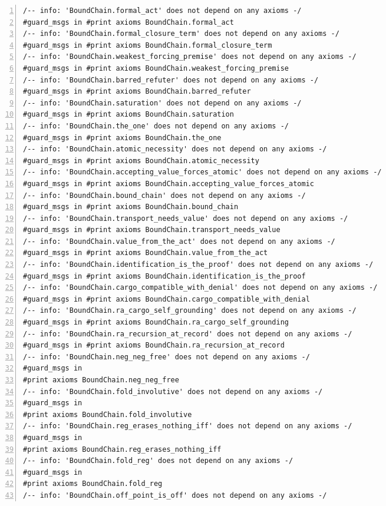 \documentclass[10pt]{article}
\newcommand{\leansize}{\fontsize{5.5pt}{6.75pt}\selectfont}
\begin{document}
\begin{multicols}{2}
\begin{Verbatim}[numbers=left,firstnumber=1,numbersep=3pt,xleftmargin=2.6em,breaklines=true,breakanywhere=true,breakautoindent=false,breakindent=1.4em,breaksymbolleft={},breakanywheresymbolpre={},fontsize=\leansize]
/-- info: 'BoundChain.formal_act' does not depend on any axioms -/
#guard_msgs in #print axioms BoundChain.formal_act
/-- info: 'BoundChain.formal_closure_term' does not depend on any axioms -/
#guard_msgs in #print axioms BoundChain.formal_closure_term
/-- info: 'BoundChain.weakest_forcing_premise' does not depend on any axioms -/
#guard_msgs in #print axioms BoundChain.weakest_forcing_premise
/-- info: 'BoundChain.barred_refuter' does not depend on any axioms -/
#guard_msgs in #print axioms BoundChain.barred_refuter
/-- info: 'BoundChain.saturation' does not depend on any axioms -/
#guard_msgs in #print axioms BoundChain.saturation
/-- info: 'BoundChain.the_one' does not depend on any axioms -/
#guard_msgs in #print axioms BoundChain.the_one
/-- info: 'BoundChain.atomic_necessity' does not depend on any axioms -/
#guard_msgs in #print axioms BoundChain.atomic_necessity
/-- info: 'BoundChain.accepting_value_forces_atomic' does not depend on any axioms -/
#guard_msgs in #print axioms BoundChain.accepting_value_forces_atomic
/-- info: 'BoundChain.bound_chain' does not depend on any axioms -/
#guard_msgs in #print axioms BoundChain.bound_chain
/-- info: 'BoundChain.transport_needs_value' does not depend on any axioms -/
#guard_msgs in #print axioms BoundChain.transport_needs_value
/-- info: 'BoundChain.value_from_the_act' does not depend on any axioms -/
#guard_msgs in #print axioms BoundChain.value_from_the_act
/-- info: 'BoundChain.identification_is_the_proof' does not depend on any axioms -/
#guard_msgs in #print axioms BoundChain.identification_is_the_proof
/-- info: 'BoundChain.cargo_compatible_with_denial' does not depend on any axioms -/
#guard_msgs in #print axioms BoundChain.cargo_compatible_with_denial
/-- info: 'BoundChain.ra_cargo_self_grounding' does not depend on any axioms -/
#guard_msgs in #print axioms BoundChain.ra_cargo_self_grounding
/-- info: 'BoundChain.ra_recursion_at_record' does not depend on any axioms -/
#guard_msgs in #print axioms BoundChain.ra_recursion_at_record
/-- info: 'BoundChain.neg_neg_free' does not depend on any axioms -/
#guard_msgs in
#print axioms BoundChain.neg_neg_free
/-- info: 'BoundChain.fold_involutive' does not depend on any axioms -/
#guard_msgs in
#print axioms BoundChain.fold_involutive
/-- info: 'BoundChain.reg_erases_nothing_iff' does not depend on any axioms -/
#guard_msgs in
#print axioms BoundChain.reg_erases_nothing_iff
/-- info: 'BoundChain.fold_reg' does not depend on any axioms -/
#guard_msgs in
#print axioms BoundChain.fold_reg
/-- info: 'BoundChain.off_point_is_off' does not depend on any axioms -/

\end{Verbatim}
\end{multicols}
\end{document}
